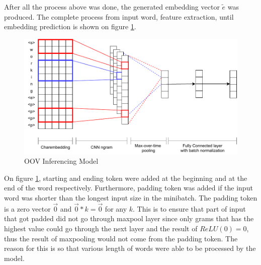         After all the process above was done, the generated embedding
        vector $\tilde{e}$ was produced.
        The complete process from input word, feature extraction,
        until embedding prediction is shown on figure \ref{fig:model}.
        \begin{figure}
            \centering
            \includegraphics[width=.8\linewidth]{images/model_batchnorm.pdf}
            \caption{OOV Inferencing Model}
            \label{fig:model}
        \end{figure}
        On figure \ref{fig:model}, starting and ending token were
        added at the beginning and at the end of the word respectively.
        Furthermore, padding token was added if the input word was
        shorter than the longest input size in the minibatch. The
        padding token is a zero vector $\vec{0}$ and $\vec{0} * k =
        \vec{0}$ for any $k$. This is to ensure that part of input
        that got padded did not go through maxpool layer since only
        grams that has the highest value could go through the next layer
        and the result of $ReLU(0) = 0$, thus the result of maxpooling
        would not come from the padding token. The reason for this is
        so that various length of words were able to be processed by
        the model.

